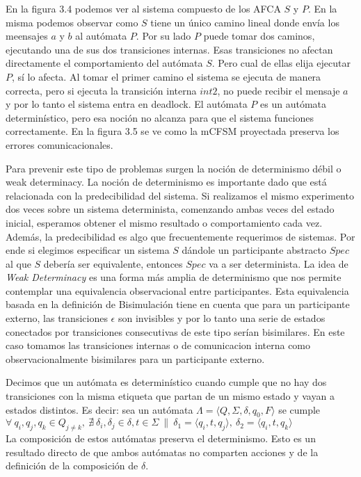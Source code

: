 En la figura 3.4 podemos ver al sistema compuesto de los AFCA $S$ y $P$. En la misma podemos observar como $S$ tiene un único camino lineal donde envía los meensajes $a$ y $b$ al autómata $P$. Por su lado $P$ puede tomar dos caminos, ejecutando una de sus dos transiciones internas. Esas transiciones no afectan directamente el comportamiento del autómata $S$. Pero cual de ellas elija ejecutar $P$, sí lo afecta. Al tomar el primer camino el sistema se ejecuta de manera correcta, pero si ejecuta la transición interna $int2$, no puede recibir el mensaje $a$ y por lo tanto el sistema entra en deadlock. El autómata $P$ es un autómata determinístico, pero esa noción no alcanza para que el sistema funciones correctamente. En la figura 3.5 se ve como la mCFSM proyectada preserva los errores comunicacionales.  

Para prevenir este tipo de problemas surgen la noción de determinismo débil o weak determinacy. La noción de determinismo es importante dado que está relacionada con la predecibilidad del sistema. Si realizamos el mismo experimento dos veces sobre un sistema determinista, comenzando ambas veces del estado inicial, esperamos obtener el mismo resultado o comportamiento cada vez. Además, la predecibilidad es algo que frecuentemente requerimos de sistemas. Por ende si elegimos especificar un sistema $S$ dándole un participante abstracto $Spec$ al que $S$ debería ser equivalente, entonces $Spec$ va a ser determinista. La idea de \emph{Weak Determinacy} \cite[Def. 11.3]{comm} es una forma más amplia de determinismo que nos permite contemplar una equivalencia observacional entre participantes. Esta equivalencia basada en la definición de Bisimulación tiene en cuenta que para un participante externo, las transiciones $\epsilon$ son invisibles y por lo tanto una serie de estados conectados por transiciones consecutivas de este tipo serían bisimilares. En este caso tomamos las transiciones internas o de comunicacion interna como observacionalmente bisimilares para un participante externo.  

\begin{definition}[Determinismo] Decimos que un autómata es determinístico cuando cumple que no hay dos transiciones con la misma etiqueta que partan de un mismo estado y vayan a estados distintos. Es decir: 
sea un autómata $ \Lambda = \langle Q, \Sigma, \delta, q_0, F \rangle$ se cumple
$ \forall \  q_i, q_j, q_k \in Q_{j \neq k}, \  \nexists \ \delta_i, \delta_j \in \delta, t \in \Sigma \ \| \  \delta_1 = \langle q_i, t, q_j \rangle, \ \delta_2 = \langle q_i, t, q_k \rangle$ \\

La composición de estos autómatas preserva el determinismo. Esto es un resultado directo de que ambos autómatas no comparten acciones y de la definición de la composición de $\delta$.\end{definition}

